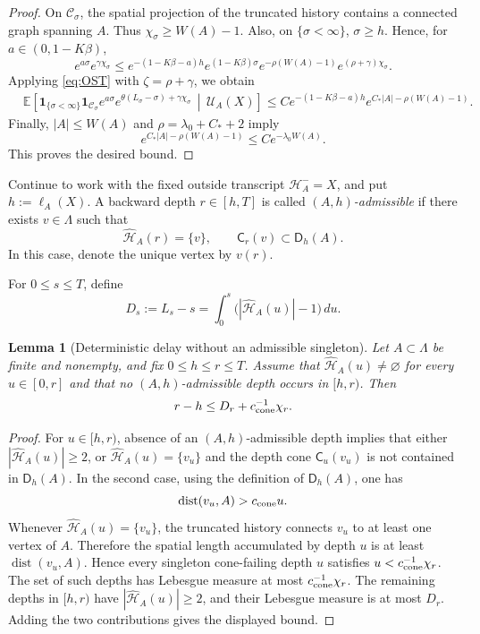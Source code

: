 \documentclass[letterpaper,11pt,reqno]{amsart}
\newtheorem{lemma}[thm]{Lemma}
\theoremstyle{definition}
\begin{document}
\begin{proof}
 
On \(\mathcal C_\sigma\), the spatial projection of the truncated history contains a connected graph spanning \(A\).
Thus $\chi_\sigma\ge W(A)-1$. 
Also, on \(\{\sigma<\infty\}\), \(\sigma\ge h\). Hence, for \(a\in(0,1-K\beta)\),
\[
        e^{a\sigma}e^{\gamma\chi_\sigma}
        \le
        e^{-(1-K\beta-a)h}
        e^{(1-K\beta)\sigma}
        e^{-\rho(W(A)-1)}
        e^{(\rho+\gamma)\chi_\sigma}.
\]
Applying \eqref{eq:OST} with \(\zeta=\rho+\gamma\), we obtain
\[
\begin{aligned}
&\mathbb E
\left[
\mathbf 1_{\{\sigma<\infty\}}\mathbf 1_{\mathcal C_\sigma}
e^{a\sigma}
e^{\theta(L_\sigma-\sigma)+\gamma\chi_\sigma}
\,\middle|\,
\mathcal U_A(X)
\right] \le
C e^{-(1-K\beta-a)h}
e^{C_*|A|-\rho(W(A)-1)} .
\end{aligned}
\]
Finally, \(|A|\le W(A)\) and \(\rho=\lambda_0+C_*+2\) imply
\[
        e^{C_*|A|-\rho(W(A)-1)}
        \le C e^{-\lambda_0 W(A)} .
\]
This proves the desired bound.
\end{proof}


Continue to work with the fixed outside transcript
\(\mathcal H_A^-=X\), and put \(h:=\ell_A(X)\).
A backward depth \(r\in[h,T]\) is called
\emph{\((A,h)\)-admissible} if there exists \(v\in\Lambda\) such that
\[
    \widehat{\mathcal H}_A(r)=\{v\},
    \qquad
    \mathsf C_r(v)\subset\mathsf D_h(A).
\]
In this case, denote the unique vertex by \(v(r)\).

For \(0\le s\le T\), define
\[
    D_s
    :=
    L_s-s
    =
    \int_0^s\bigl(|\widehat{\mathcal H}_A(u)|-1\bigr)\,du.
\]

\begin{lemma}[Deterministic delay without an admissible singleton]
\label{lem:no-admissible-delay}
Let \(A\subset\Lambda\) be finite and nonempty, and fix
\(0\le h\le r\le T\). Assume that
\(\widehat{\mathcal H}_A(u)\ne\varnothing\) for every \(u\in[0,r]\)
and that no \((A,h)\)-admissible depth occurs in \([h,r)\).
Then
\[
    r-h
    \le
    D_r+c_{\rm cone}^{-1}\chi_r.
\]
\end{lemma}

\begin{proof}
For \(u\in[h,r)\), absence of an \((A,h)\)-admissible depth implies that either
\(|\widehat{\mathcal H}_A(u)|\ge2\), or \(\widehat{\mathcal H}_A(u)=\{v_u\}\) and the depth cone
\(\mathsf C_u(v_u)\) is not contained in \({\mathsf D}_h(A)\).  In the
second case, using the definition of \({\mathsf D}_h(A)\), one has
\[
        \operatorname{dist}(v_u,A)>c_{\rm cone}u .
\]
Whenever \(\widehat{\mathcal H}_A(u)=\{v_u\}\), the truncated history connects \(v_u\) to at least
one vertex of \(A\).  Therefore the spatial length accumulated by depth \(u\)
is at least \(\operatorname{dist}(v_u,A)\).  Hence every singleton
cone-failing depth \(u\) satisfies \(u<c_{\rm cone}^{-1}\chi_r\).  The set of
such depths has Lebesgue measure at most \(c_{\rm cone}^{-1}\chi_r\).
The remaining depths in \([h,r)\) have \(|\widehat{\mathcal H}_A(u)|\ge2\), and their Lebesgue
measure is at most \(D_r\). Adding the two contributions gives the displayed
bound.
\end{proof}
\end{document}
